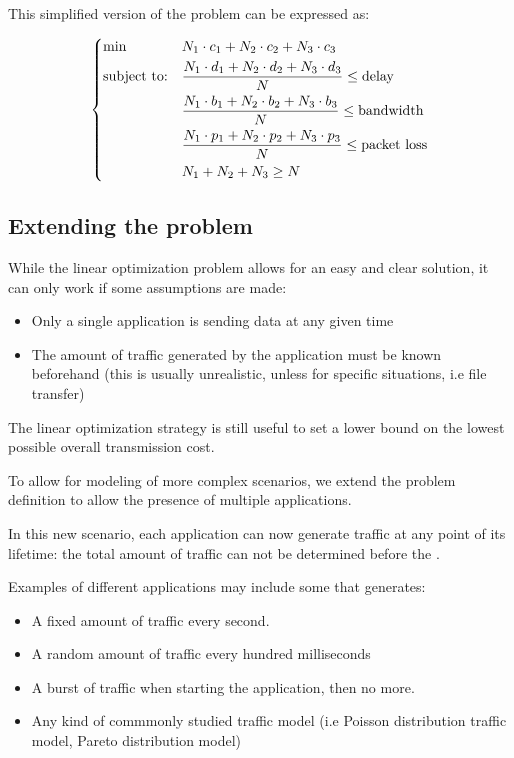 \documentclass{article}
\begin{document}
This simplified version of the problem can be expressed as: 

\begin{equation}\label{eq:linear_formulation_final}
	\begin{dcases}
		\begin{aligned}
			& {\text{min}}
			& & N_1 \cdot c_1 + N_2 \cdot c_2 +	N_3 \cdot c_3 \\
			& \text{subject to:}
			& & \frac
			{N_1 \cdot d_1 + N_2 \cdot d_2  + N_3 \cdot d_3 }
			{N}
			\le \text{delay} \\
			& & & \frac
			{N_1 \cdot b_1 + N_2 \cdot b_2  + N_3 \cdot b_3 }
			{N}
			\le \text{bandwidth} \\
			& & & \frac
			{N_1 \cdot p_1 + N_2 \cdot p_2 + N_3 \cdot p_3 }
			{N}
			\le \text{packet loss} \\
			& & &
			N_1 + N_2 + N_3 \ge N
		\end{aligned}
	\end{dcases}
\end{equation}



\subsection{Extending the problem}
While the linear optimization problem allows for an easy and clear solution, it can only work if some assumptions are made:

\begin{itemize}
	\item Only a single application is sending data at any given time
	\item The amount of traffic generated by the application must be known beforehand (this is usually unrealistic, unless for specific situations, i.e file transfer)
\end{itemize}

The linear optimization strategy is still useful to set a lower bound on the lowest possible overall transmission cost.

To allow for modeling of more complex scenarios, we extend the problem definition to allow the presence of multiple applications.

In this new scenario, each application can now generate traffic at any point of its lifetime: the total amount of traffic can not be determined before the .

Examples of different applications may include some that generates:
\begin{itemize}
	\item A fixed amount of traffic every second.
	\item A random amount of traffic every hundred milliseconds
	\item A burst of traffic when starting the application, then no more.
	\item Any kind of commmonly studied traffic model (i.e Poisson distribution traffic model, Pareto distribution model)
\end{itemize}
\end{document}
